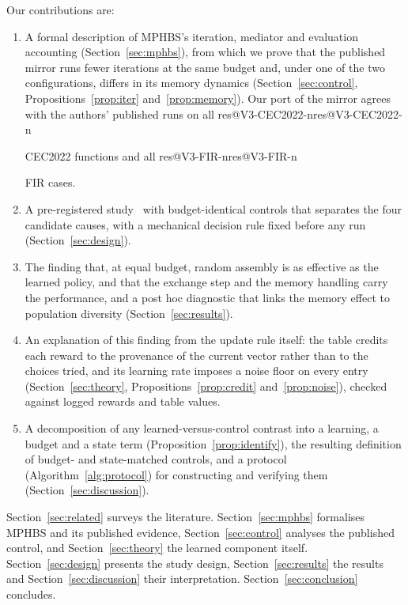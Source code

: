 \documentclass[11pt]{article}
\makeatletter
\theoremstyle{definition}
\theoremstyle{remark}
\renewcommand\res[1]{\ifcsname res@#1\endcsname\csname res@#1\endcsname\else\PackageError{res}{Undefined result key #1}{}\fi}
\makeatother
\begin{document}
Our contributions are:
\begin{enumerate}
\item A formal description of MPHBS's iteration, mediator and evaluation accounting (Section~\ref{sec:mphbs}), from which
  we prove that the published mirror runs fewer iterations at the same budget and, under one of the two configurations,
  differs in its memory dynamics (Section~\ref{sec:control}, Propositions~\ref{prop:iter} and~\ref{prop:memory}). Our port
  of the mirror agrees with the authors' published runs on all \res{V3-CEC2022-n} CEC2022 functions and all
  \res{V3-FIR-n} FIR cases.
\item A pre-registered study~\citep{nosek2018preregistration} with budget-identical controls that separates the four
  candidate causes, with a mechanical decision rule fixed before any run (Section~\ref{sec:design}).
\item The finding that, at equal budget, random assembly is as effective as the learned policy, and that the exchange
  step and the memory handling carry the performance, and a post hoc diagnostic that links the memory effect to population diversity
  (Section~\ref{sec:results}).
\item An explanation of this finding from the update rule itself: the table credits each reward to the provenance of
  the current vector rather than to the choices tried, and its learning rate imposes a noise floor on every entry
  (Section~\ref{sec:theory}, Propositions~\ref{prop:credit} and~\ref{prop:noise}), checked against logged rewards and
  table values.
\item A decomposition of any learned-versus-control contrast into a learning, a budget and a state term
  (Proposition~\ref{prop:identify}), the resulting definition of budget- and state-matched controls, and a protocol
  (Algorithm~\ref{alg:protocol}) for constructing and verifying them (Section~\ref{sec:discussion}).
\end{enumerate}

Section~\ref{sec:related} surveys the literature. Section~\ref{sec:mphbs} formalises MPHBS and its published evidence,
Section~\ref{sec:control} analyses the published control, and Section~\ref{sec:theory} the learned component itself.
Section~\ref{sec:design} presents the study design,
Section~\ref{sec:results} the results and Section~\ref{sec:discussion} their interpretation. Section~\ref{sec:conclusion}
concludes.

\end{document}
